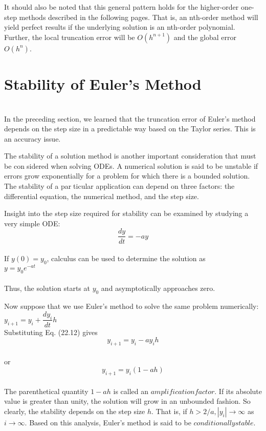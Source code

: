 It should also be noted that this general pattern holds for the higher-order one-step
methods described in the following pages. That is, an nth-order method will yield perfect
results if the underlying solution is an nth-order polynomial. Further, the local truncation
error will be $O(h^{n+1})$ and the global error $O(h^n)$.

\section{Stability of Euler’s Method}\\
In the preceding section, we learned that the truncation error of Euler’s method depends on
the step size in a predictable way based on the Taylor series. This is an accuracy issue.

The stability of a solution method is another important consideration that must be considered when solving ODEs. A numerical solution is said to be unstable if errors grow
exponentially for a problem for which there is a bounded solution. The stability of a particular application can depend on three factors: the differential equation, the numerical
method, and the step size.

Insight into the step size required for stability can be examined by studying a very
simple ODE:\\
\begin{equation}
\tag{22.12}
\dfrac{dy}{dt} = -ay
\end{equation}\\
If $y(0) = y_{0}$, calculus can be used to determine the solution as\\

$y=y_{0}e^{-at}$\\
\\
Thus, the solution starts at $y_{0}$ and asymptotically approaches zero.

Now suppose that we use Euler’s method to solve the same problem numerically:\\

$y_{i+1} = y_{i} + \dfrac{dy_{i}}{dt} h$
\\
Substituting Eq. (22.12) gives\\

$$y_{i+1} = y_{i} - ay_{i}h$$\\
or\\
\begin{equation}
\tag{22.13}
y_{i+1} = y_{i}(1-ah)
\end{equation}\\
The parenthetical quantity $1 − ah$ is called an $amplification factor$. If its absolute value is
greater than unity, the solution will grow in an unbounded fashion. So clearly, the stability
depends on the step size $h$. That is, if $ h > 2/a, |y_{i}| \rightarrow \infty$ as $ i \rightarrow \infty $. Based on this analysis, Euler’s method is said to be $conditionally stable$.


